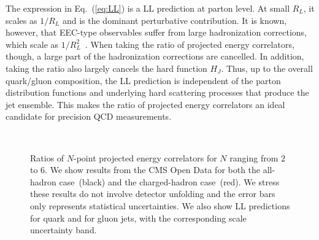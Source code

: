 \documentclass[aps,prl,twocolumn,showpacs,10pt,superscriptaddress,preprintnumbers,nofootinbib,longbibliography]{revtex4-1}
\DeclareRobustCommand{\Eq}[1]{Eq.~(\ref{#1})}
\begin{document}
The expression in \Eq{eq:LL} is a LL prediction at parton level.
%
At small $R_L$, it scales as $1/R_L$ and is the dominant perturbative contribution.
%
It is known, however, that EEC-type observables suffer from large hadronization corrections, which scale as $1/R_L^2$~\cite{Basham:1978zq,Korchemsky:1994is,Korchemsky:1997sy,Korchemsky:1999kt}.
%
When taking the ratio of projected energy correlators, though, a large part of the hadronization corrections are cancelled.
%
In addition, taking the ratio also largely cancels the hard function $H_J$.
%
Thus, up to the overall quark/gluon composition, the LL prediction is independent of the parton distribution functions and underlying hard scattering processes that produce the jet ensemble.
%
This makes the ratio of projected energy correlators an ideal candidate for precision QCD measurements.


\begin{figure}[t]
\\
\caption{Ratios of $N$-point projected energy correlators for $N$ ranging from $2$ to $6$.
%
We show results from the CMS Open Data for both the all-hadron case~(black) and the charged-hadron case~(red).
%
We stress these results do not involve detector unfolding and the error bars only represents statistical uncertainties.
%
We also show LL predictions for quark and for gluon jets, with the corresponding scale uncertainty band.}
\label{fig:LL_vs_CMS}
\end{figure}
\end{document}
